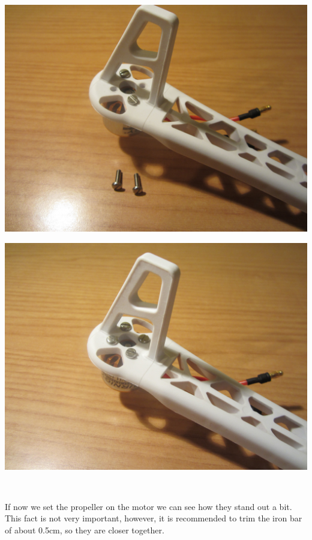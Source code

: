 \documentclass[12pt, a4paper,twoside]{tesi_upf}
\begin{document}
\begin{minipage}{0.5\textwidth}
  \centering
  \includegraphics[width=0.8\linewidth]{Images/Mounting/IMG_0449.jpg}
  \label{diagScrews}
\end{minipage}%
\begin{minipage}{0.5\textwidth}
  \centering
  \includegraphics[width=0.8\linewidth]{Images/Mounting/IMG_0450.jpg}
  \label{allScrews}
\end{minipage}
\\[12pt]
\clearpage

If now we set the propeller on the motor we can see how they stand out a bit. This fact is not very important, however, it is recommended to trim the iron bar of about 0.5cm, so they are closer together.
\\[12pt]
\end{document}
